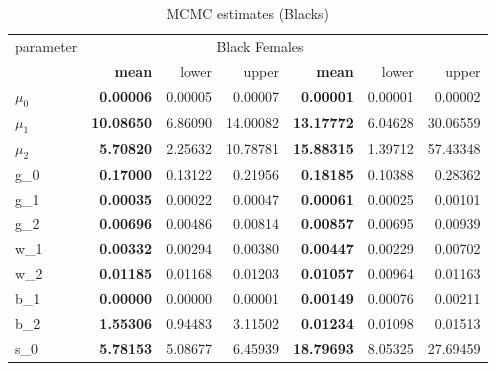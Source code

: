 \begin{table}

\caption{\label{tab:}MCMC estimates (Blacks)}
\centering
\begin{tabular}[t]{l>{\bfseries\leavevmode\color{black}}rrr>{\bfseries\leavevmode\color{black}}rrr}
\toprule
\multicolumn{1}{c}{parameter} & \multicolumn{3}{c}{Black Males} & \multicolumn{3}{c}{Black Females} \\
\cmidrule(l{3pt}r{3pt}){1-1} \cmidrule(l{3pt}r{3pt}){2-4} \cmidrule(l{3pt}r{3pt}){5-7}
  & mean & lower & upper & mean & lower & upper\\
\midrule
$\mu_0$ & 0.00006 & 0.00005 & 0.00007 & 0.00001 & 0.00001 & 0.00002\\
$\mu_1$ & 10.08650 & 6.86090 & 14.00082 & 13.17772 & 6.04628 & 30.06559\\
$\mu_2$ & 5.70820 & 2.25632 & 10.78781 & 15.88315 & 1.39712 & 57.43348\\
g_0 & 0.17000 & 0.13122 & 0.21956 & 0.18185 & 0.10388 & 0.28362\\
g_1 & 0.00035 & 0.00022 & 0.00047 & 0.00061 & 0.00025 & 0.00101\\
g_2 & 0.00696 & 0.00486 & 0.00814 & 0.00857 & 0.00695 & 0.00939\\
\addlinespace
w_1 & 0.00332 & 0.00294 & 0.00380 & 0.00447 & 0.00229 & 0.00702\\
w_2 & 0.01185 & 0.01168 & 0.01203 & 0.01057 & 0.00964 & 0.01163\\
b_1 & 0.00000 & 0.00000 & 0.00001 & 0.00149 & 0.00076 & 0.00211\\
b_2 & 1.55306 & 0.94483 & 3.11502 & 0.01234 & 0.01098 & 0.01513\\
s_0 & 5.78153 & 5.08677 & 6.45939 & 18.79693 & 8.05325 & 27.69459\\
\bottomrule
\end{tabular}
\end{table}
